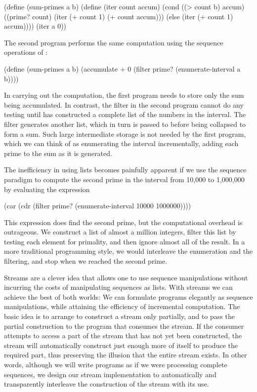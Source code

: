 \begin{codeBlock}
(define (sum-primes a b)
  (define (iter count accum)
    (cond ((> count b) accum)
          ((prime? count)
             (iter (+ count 1) (+ count accum)))
          (else (iter (+ count 1) accum))))
  (iter a 0))
\end{codeBlock}

\noindent
The second program performs the same computation using the sequence operations
of :

\begin{codeBlock}
(define (sum-primes a b)
  (accumulate +
              0
              (filter prime?
                      (enumerate-interval a b))))
\end{codeBlock}

\noindent
In carrying out the computation, the first program needs to store only the sum
being accumulated.  In contrast, the filter in the second program cannot do any
testing until  has constructed a complete list of the
numbers in the interval.  The filter generates another list, which in turn is
passed to  before being collapsed to form a sum.  Such large
intermediate storage is not needed by the first program, which we can think of
as enumerating the interval incrementally, adding each prime to the sum as it
is generated.

The inefficiency in using lists becomes painfully apparent if we use the
sequence paradigm to compute the second prime in the interval from 10,000 to
1,000,000 by evaluating the expression

\begin{codeBlock}
(car (cdr (filter prime?
                  (enumerate-interval 10000 1000000))))
\end{codeBlock}

\noindent
This expression does find the second prime, but the computational overhead is
outrageous.  We construct a list of almost a million integers, filter this list
by testing each element for primality, and then ignore almost all of the
result.  In a more traditional programming style, we would interleave the
enumeration and the filtering, and stop when we reached the second prime.

Streams are a clever idea that allows one to use sequence manipulations without
incurring the costs of manipulating sequences as lists.  With streams we can
achieve the best of both worlds: We can formulate programs elegantly as
sequence manipulations, while attaining the efficiency of incremental
computation.  The basic idea is to arrange to construct a stream only
partially, and to pass the partial construction to the program that consumes
the stream.  If the consumer attempts to access a part of the stream that has
not yet been constructed, the stream will automatically construct just enough
more of itself to produce the required part, thus preserving the illusion that
the entire stream exists.  In other words, although we will write programs as
if we were processing complete sequences, we design our stream implementation
to automatically and transparently interleave the construction of the stream
with its use.

